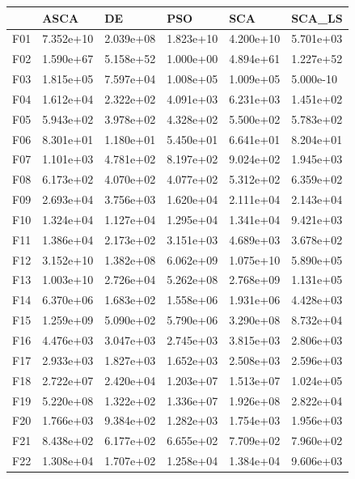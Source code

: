 \begin{tabular}{llllll}
\toprule
{} &       ASCA &         DE &        PSO &        SCA &     SCA\_LS \\
\midrule
F01  &  7.352e+10 &  2.039e+08 &  1.823e+10 &  4.200e+10 &  5.701e+03 \\
F02  &  1.590e+67 &  5.158e+52 &  1.000e+00 &  4.894e+61 &  1.227e+52 \\
F03  &  1.815e+05 &  7.597e+04 &  1.008e+05 &  1.009e+05 &  5.000e-10 \\
F04  &  1.612e+04 &  2.322e+02 &  4.091e+03 &  6.231e+03 &  1.451e+02 \\
F05  &  5.943e+02 &  3.978e+02 &  4.328e+02 &  5.500e+02 &  5.783e+02 \\
F06  &  8.301e+01 &  1.180e+01 &  5.450e+01 &  6.641e+01 &  8.204e+01 \\
F07  &  1.101e+03 &  4.781e+02 &  8.197e+02 &  9.024e+02 &  1.945e+03 \\
F08  &  6.173e+02 &  4.070e+02 &  4.077e+02 &  5.312e+02 &  6.359e+02 \\
F09  &  2.693e+04 &  3.756e+03 &  1.620e+04 &  2.111e+04 &  2.143e+04 \\
F10  &  1.324e+04 &  1.127e+04 &  1.295e+04 &  1.341e+04 &  9.421e+03 \\
F11  &  1.386e+04 &  2.173e+02 &  3.151e+03 &  4.689e+03 &  3.678e+02 \\
F12  &  3.152e+10 &  1.382e+08 &  6.062e+09 &  1.075e+10 &  5.890e+05 \\
F13  &  1.003e+10 &  2.726e+04 &  5.262e+08 &  2.768e+09 &  1.131e+05 \\
F14  &  6.370e+06 &  1.683e+02 &  1.558e+06 &  1.931e+06 &  4.428e+03 \\
F15  &  1.259e+09 &  5.090e+02 &  5.790e+06 &  3.290e+08 &  8.732e+04 \\
F16  &  4.476e+03 &  3.047e+03 &  2.745e+03 &  3.815e+03 &  2.806e+03 \\
F17  &  2.933e+03 &  1.827e+03 &  1.652e+03 &  2.508e+03 &  2.596e+03 \\
F18  &  2.722e+07 &  2.420e+04 &  1.203e+07 &  1.513e+07 &  1.024e+05 \\
F19  &  5.220e+08 &  1.322e+02 &  1.336e+07 &  1.926e+08 &  2.822e+04 \\
F20  &  1.766e+03 &  9.384e+02 &  1.282e+03 &  1.754e+03 &  1.956e+03 \\
F21  &  8.438e+02 &  6.177e+02 &  6.655e+02 &  7.709e+02 &  7.960e+02 \\
F22  &  1.308e+04 &  1.707e+02 &  1.258e+04 &  1.384e+04 &  9.606e+03 \\

\end{tabular}
